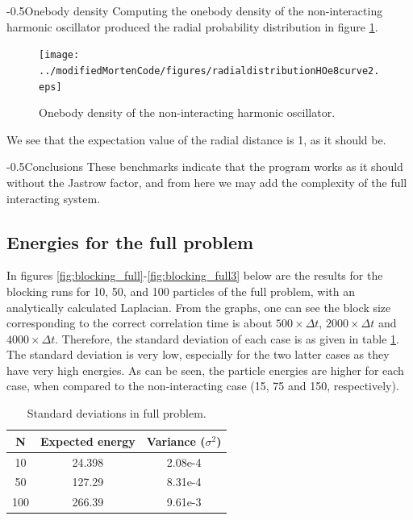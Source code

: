 \documentclass[english, a4paper]{article}
\makeatletter
\renewcommand{\subsubsection}{\@startsection{subsubsection}{3}{0pt}%
{-\baselineskip}{0.5\baselineskip}{\bf\large}}
\makeatother
\begin{document}
\subsubsection{Onebody density}
Computing the onebody density of the non-interacting harmonic oscillator produced the radial probability distribution in figure \ref{fig:radialProbabilityDistributionHO}.
\begin{figure}[H]
	\begin{center}
		\texttt{[image: ../modifiedMortenCode/figures/radialdistributionHOe8curve2.eps]}
		\caption{Onebody density of the non-interacting harmonic oscillator.}\label{fig:radialProbabilityDistributionHO}
	\end{center}
\end{figure}

We see that the expectation value of the radial distance is 1, as it should be.


\subsubsection{Conclusions}
These benchmarks indicate that the program works as it should without the Jastrow factor, and from here we may add the complexity of the full interacting system.

\subsection{Energies for the full problem}
In figures \ref{fig:blocking_full}-\ref{fig:blocking_full3} below are the results for the blocking runs for 10, 50, and 100 particles of the full problem, with an analytically calculated Laplacian. From the graphs, one can see the block size corresponding to the correct correlation time is about $500\times\Delta t$, $2000\times\Delta t$ and $4000\times\Delta t$. Therefore, the standard deviation of each case is as given in table \ref{tab:Tabell4}. The standard deviation is very low, especially for the two latter cases as they have very high energies.
As can be seen, the particle energies are higher for each case, when compared to the non-interacting case (15, 75 and 150, respectively).

\begin{table}[H]
	\centering
	\caption{Standard deviations in full problem.}
	\begin{tabular}{ | c | c | c |}
		\hline
		N & Expected energy & Variance ($\sigma^2$)\\*
		\hline
		10 & 24.398 & 2.08e-4\\%
		50 & 127.29 & 8.31e-4\\%
		100 & 266.39 & 9.61e-3\\%
		\hline
	\end{tabular}
	\label{tab:Tabell4}
\end{table}
\end{document}
